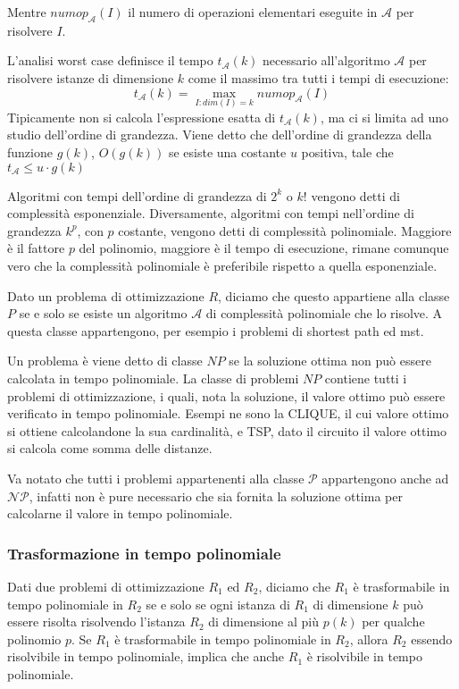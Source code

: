 \documentclass[../template]{subfiles}
\begin{document}
Mentre $numop_\mathcal{A}(I)$ il numero di operazioni elementari eseguite in $\mathcal{A}$ per risolvere $I$.

L'analisi worst case definisce il tempo $t_\mathcal{A}(k)$ necessario all'algoritmo $\mathcal{A}$ per risolvere istanze di dimensione $k$ come il massimo tra tutti i tempi di esecuzione:
\[
    t_\mathcal{A}(k) = \max_{I: dim(I) = k} numop_\mathcal{A}(I)
\]
Tipicamente non si calcola l'espressione esatta di $t_\mathcal{A}(k)$, ma ci si limita ad uno studio dell'ordine di grandezza. Viene detto che dell'ordine di grandezza della funzione $g(k)$, $O(g(k))$ se esiste una costante $u$ positiva, tale che $t_\mathcal{A} \le u\cdot g(k)$

Algoritmi con tempi dell'ordine di grandezza di $2^k$ o $k!$ vengono detti di complessità esponenziale. Diversamente, algoritmi con tempi nell'ordine di grandezza $k^p$, con $p$ costante, vengono detti di complessità polinomiale.
Maggiore è il fattore $p$ del polinomio, maggiore è il tempo di esecuzione, rimane comunque vero che la complessità polinomiale è preferibile rispetto a quella esponenziale.

Dato un problema di ottimizzazione $R$, diciamo che questo appartiene alla classe $P$ se e solo se esiste un algoritmo $\mathcal{A}$ di complessità polinomiale che lo risolve.
A questa classe appartengono, per esempio i problemi di shortest path ed mst.

Un problema è viene detto di classe $NP$ se la soluzione ottima non può essere calcolata in tempo polinomiale.
La classe di problemi $NP$ contiene tutti i problemi di ottimizzazione, i quali, nota la soluzione, il valore ottimo può essere verificato in tempo polinomiale.
Esempi ne sono la CLIQUE, il cui valore ottimo si ottiene calcolandone la sua cardinalità, e TSP, dato il circuito il valore ottimo si calcola come somma delle distanze.

Va notato che tutti i problemi appartenenti alla classe $\mathcal{P}$ appartengono anche ad $\mathcal{NP}$, infatti non è pure necessario che sia fornita la soluzione ottima per calcolarne il valore in tempo polinomiale.

\subsubsection{Trasformazione in tempo polinomiale}
Dati due problemi di ottimizzazione $R_1$ ed $R_2$, diciamo che $R_1$ è trasformabile in tempo polinomiale in $R_2$ se e solo se ogni istanza di $R_1$ di dimensione $k$ può essere risolta risolvendo l'istanza $R_2$ di dimensione al più $p(k)$ per qualche polinomio $p$. Se $R_1$ è trasformabile in tempo polinomiale in $R_2$, allora $R_2$ essendo risolvibile in tempo polinomiale, implica che anche $R_1$ è risolvibile in tempo polinomiale.
\end{document}
